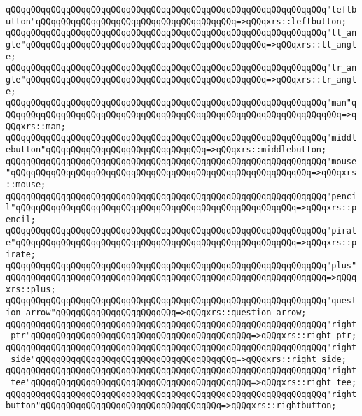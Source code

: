 \verb|qQQqqQQqqQQqqQQqqQQqqQQqqQQqqQQqqQQqqQQqqQQqqQQqqQQqqQQqqQQqqQQq"leftbutton"qQQqqQQqqQQqqQQqqQQqqQQqqQQqqQQqqQQqqQQq=>qQQqxrs::leftbutton;|\newline
\verb|qQQqqQQqqQQqqQQqqQQqqQQqqQQqqQQqqQQqqQQqqQQqqQQqqQQqqQQqqQQqqQQq"ll_angle"qQQqqQQqqQQqqQQqqQQqqQQqqQQqqQQqqQQqqQQqqQQqqQQq=>qQQqxrs::ll_angle;|\newline
\verb|qQQqqQQqqQQqqQQqqQQqqQQqqQQqqQQqqQQqqQQqqQQqqQQqqQQqqQQqqQQqqQQq"lr_angle"qQQqqQQqqQQqqQQqqQQqqQQqqQQqqQQqqQQqqQQqqQQqqQQq=>qQQqxrs::lr_angle;|\newline
\verb|qQQqqQQqqQQqqQQqqQQqqQQqqQQqqQQqqQQqqQQqqQQqqQQqqQQqqQQqqQQqqQQq"man"qQQqqQQqqQQqqQQqqQQqqQQqqQQqqQQqqQQqqQQqqQQqqQQqqQQqqQQqqQQqqQQqqQQq=>qQQqxrs::man;|\newline
\verb|qQQqqQQqqQQqqQQqqQQqqQQqqQQqqQQqqQQqqQQqqQQqqQQqqQQqqQQqqQQqqQQq"middlebutton"qQQqqQQqqQQqqQQqqQQqqQQqqQQqqQQq=>qQQqxrs::middlebutton;|\newline
\verb|qQQqqQQqqQQqqQQqqQQqqQQqqQQqqQQqqQQqqQQqqQQqqQQqqQQqqQQqqQQqqQQq"mouse"qQQqqQQqqQQqqQQqqQQqqQQqqQQqqQQqqQQqqQQqqQQqqQQqqQQqqQQqqQQq=>qQQqxrs::mouse;|\newline
\verb|qQQqqQQqqQQqqQQqqQQqqQQqqQQqqQQqqQQqqQQqqQQqqQQqqQQqqQQqqQQqqQQq"pencil"qQQqqQQqqQQqqQQqqQQqqQQqqQQqqQQqqQQqqQQqqQQqqQQqqQQqqQQq=>qQQqxrs::pencil;|\newline
\verb|qQQqqQQqqQQqqQQqqQQqqQQqqQQqqQQqqQQqqQQqqQQqqQQqqQQqqQQqqQQqqQQq"pirate"qQQqqQQqqQQqqQQqqQQqqQQqqQQqqQQqqQQqqQQqqQQqqQQqqQQqqQQq=>qQQqxrs::pirate;|\newline
\verb|qQQqqQQqqQQqqQQqqQQqqQQqqQQqqQQqqQQqqQQqqQQqqQQqqQQqqQQqqQQqqQQq"plus"qQQqqQQqqQQqqQQqqQQqqQQqqQQqqQQqqQQqqQQqqQQqqQQqqQQqqQQqqQQqqQQq=>qQQqxrs::plus;|\newline
\verb|qQQqqQQqqQQqqQQqqQQqqQQqqQQqqQQqqQQqqQQqqQQqqQQqqQQqqQQqqQQqqQQq"question_arrow"qQQqqQQqqQQqqQQqqQQqqQQq=>qQQqxrs::question_arrow;|\newline
\verb|qQQqqQQqqQQqqQQqqQQqqQQqqQQqqQQqqQQqqQQqqQQqqQQqqQQqqQQqqQQqqQQq"right_ptr"qQQqqQQqqQQqqQQqqQQqqQQqqQQqqQQqqQQqqQQqqQQq=>qQQqxrs::right_ptr;|\newline
\verb|qQQqqQQqqQQqqQQqqQQqqQQqqQQqqQQqqQQqqQQqqQQqqQQqqQQqqQQqqQQqqQQq"right_side"qQQqqQQqqQQqqQQqqQQqqQQqqQQqqQQqqQQqqQQq=>qQQqxrs::right_side;|\newline
\verb|qQQqqQQqqQQqqQQqqQQqqQQqqQQqqQQqqQQqqQQqqQQqqQQqqQQqqQQqqQQqqQQq"right_tee"qQQqqQQqqQQqqQQqqQQqqQQqqQQqqQQqqQQqqQQqqQQq=>qQQqxrs::right_tee;|\newline
\verb|qQQqqQQqqQQqqQQqqQQqqQQqqQQqqQQqqQQqqQQqqQQqqQQqqQQqqQQqqQQqqQQq"rightbutton"qQQqqQQqqQQqqQQqqQQqqQQqqQQqqQQqqQQq=>qQQqxrs::rightbutton;|\newline
